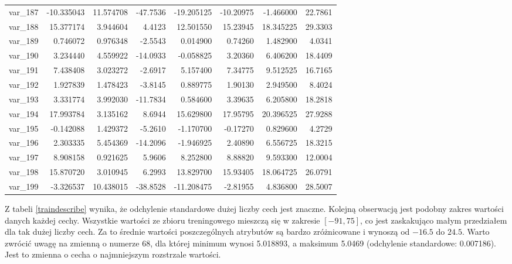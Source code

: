 ﻿\documentclass[12pt]{article}
\begin{document}
\begin{longtable}{lrrrrrrr}
 var\_187 & -10.335043 &  11.574708 & -47.7536 & -19.205125 & -10.20975 &  -1.466000 &  22.7861 \\
 var\_188 &  15.377174 &   3.944604 &   4.4123 &  12.501550 &  15.23945 &  18.345225 &  29.3303 \\
 var\_189 &   0.746072 &   0.976348 &  -2.5543 &   0.014900 &   0.74260 &   1.482900 &   4.0341 \\
 var\_190 &   3.234440 &   4.559922 & -14.0933 &  -0.058825 &   3.20360 &   6.406200 &  18.4409 \\
 var\_191 &   7.438408 &   3.023272 &  -2.6917 &   5.157400 &   7.34775 &   9.512525 &  16.7165 \\
 var\_192 &   1.927839 &   1.478423 &  -3.8145 &   0.889775 &   1.90130 &   2.949500 &   8.4024 \\
 var\_193 &   3.331774 &   3.992030 & -11.7834 &   0.584600 &   3.39635 &   6.205800 &  18.2818 \\
 var\_194 &  17.993784 &   3.135162 &   8.6944 &  15.629800 &  17.95795 &  20.396525 &  27.9288 \\
 var\_195 &  -0.142088 &   1.429372 &  -5.2610 &  -1.170700 &  -0.17270 &   0.829600 &   4.2729 \\
 var\_196 &   2.303335 &   5.454369 & -14.2096 &  -1.946925 &   2.40890 &   6.556725 &  18.3215 \\
 var\_197 &   8.908158 &   0.921625 &   5.9606 &   8.252800 &   8.88820 &   9.593300 &  12.0004 \\
 var\_198 &  15.870720 &   3.010945 &   6.2993 &  13.829700 &  15.93405 &  18.064725 &  26.0791 \\
 var\_199 &  -3.326537 &  10.438015 & -38.8528 & -11.208475 &  -2.81955 &   4.836800 &  28.5007 \\
\end{longtable}

Z tabeli \ref{traindescribe} wynika, że odchylenie standardowe dużej liczby cech jest znaczne. Kolejną obserwacją jest podobny zakres wartości danych każdej cechy. Wszystkie wartości ze zbioru treningowego mieszczą się w zakresie $[-91, 75]$, co jest zaskakująco małym przedziałem dla tak dużej liczby cech. Za to średnie wartości poszczególnych atrybutów są bardzo zróżnicowane i wynoszą od $-16.5$ do $24.5$. Warto zwrócić uwagę na zmienną o numerze $68$, dla której minimum wynosi 5.018893, a maksimum 5.0469 (odchylenie standardowe: 0.007186). Jest to zmienna o cecha o najmniejszym rozstrzale wartości.
\newline 
\end{document}
